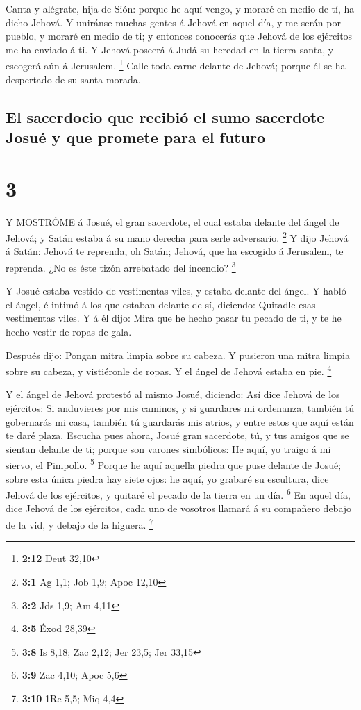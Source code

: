  Canta y alégrate, hija de Sión: porque he aquí vengo, y
moraré en medio de tí, ha dicho Jehová.  Y uniránse muchas
gentes á Jehová en aquel día, y me serán por pueblo, y moraré en medio
de ti; y entonces conocerás que Jehová de los ejércitos me ha enviado á
ti.  Y Jehová poseerá á Judá su heredad en la tierra santa,
y escogerá aún á Jerusalem. \footnote{\textbf{2:12} Deut 32,10}
 Calle toda carne delante de Jehová; porque él se ha
despertado de su santa morada.

\hypertarget{el-sacerdocio-que-recibiuxf3-el-sumo-sacerdote-josuuxe9-y-que-promete-para-el-futuro}{%
\subsection{El sacerdocio que recibió el sumo sacerdote Josué y que
promete para el
futuro}\label{el-sacerdocio-que-recibiuxf3-el-sumo-sacerdote-josuuxe9-y-que-promete-para-el-futuro}}

\hypertarget{section-2}{%
\section{3}\label{section-2}}

 Y MOSTRÓME á Josué, el gran sacerdote, el cual estaba
delante del ángel de Jehová; y Satán estaba á su mano derecha para serle
adversario. \footnote{\textbf{3:1} Ag 1,1; Job 1,9; Apoc 12,10}
 Y dijo Jehová á Satán: Jehová te reprenda, oh Satán;
Jehová, que ha escogido á Jerusalem, te reprenda. ¿No es éste tizón
arrebatado del incendio? \footnote{\textbf{3:2} Jds 1,9; Am 4,11}

 Y Josué estaba vestido de vestimentas viles, y estaba
delante del ángel.  Y habló el ángel, é intimó á los que
estaban delante de sí, diciendo: Quitadle esas vestimentas viles. Y á él
dijo: Mira que he hecho pasar tu pecado de ti, y te he hecho vestir de
ropas de gala.

 Después dijo: Pongan mitra limpia sobre su cabeza. Y
pusieron una mitra limpia sobre su cabeza, y vistiéronle de ropas. Y el
ángel de Jehová estaba en pie. \footnote{\textbf{3:5} Éxod 28,39}

 Y el ángel de Jehová protestó al mismo Josué, diciendo:
 Así dice Jehová de los ejércitos: Si anduvieres por mis
caminos, y si guardares mi ordenanza, también tú gobernarás mi casa,
también tú guardarás mis atrios, y entre estos que aquí están te daré
plaza.  Escucha pues ahora, Josué gran sacerdote, tú, y tus
amigos que se sientan delante de ti; porque son varones simbólicos: He
aquí, yo traigo á mi siervo, el Pimpollo. \footnote{\textbf{3:8} Is
  8,18; Zac 2,12; Jer 23,5; Jer 33,15}  Porque he aquí
aquella piedra que puse delante de Josué; sobre esta única piedra hay
siete ojos: he aquí, yo grabaré su escultura, dice Jehová de los
ejércitos, y quitaré el pecado de la tierra en un día. \footnote{\textbf{3:9}
  Zac 4,10; Apoc 5,6}  En aquel día, dice Jehová de los
ejércitos, cada uno de vosotros llamará á su compañero debajo de la vid,
y debajo de la higuera. \footnote{\textbf{3:10} 1Re 5,5; Miq 4,4}

